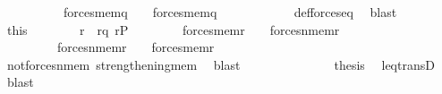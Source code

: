 \begin{isabellebody}
\ \ \ \ \ \ \ \ \ {\isacharparenleft}{\kern0pt}{\isasymnot}\ forces{\isacharunderscore}{\kern0pt}mem{\isacharparenleft}{\kern0pt}q{\isacharcomma}{\kern0pt}\ {\isasymsigma}{\isacharcomma}{\kern0pt}\ {\isasymtau}{\isacharparenright}{\kern0pt}\ {\isasymand}\ forces{\isacharunderscore}{\kern0pt}mem{\isacharparenleft}{\kern0pt}q{\isacharcomma}{\kern0pt}\ {\isasymsigma}{\isacharcomma}{\kern0pt}\ {\isasymtheta}{\isacharparenright}{\kern0pt}{\isacharparenright}{\kern0pt}{\isachardoublequoteclose}\isanewline
\ \ \ \ \ \ \ \ \isamarkupfalse%
\ def{\isacharunderscore}{\kern0pt}forces{\isacharunderscore}{\kern0pt}eq\ \isamarkupfalse%
\ blast\isanewline
\ \ \ \ \ \ \isamarkupfalse%
\ \isamarkupfalse%
\ this\isanewline
\ \ \ \ \ \ \isamarkupfalse%
\ r\ \ {\isachardoublequoteopen}r{\isasympreceq}q{\isachardoublequoteclose}\ {\isachardoublequoteopen}r{\isasymin}P{\isachardoublequoteclose}\isanewline
\ \ \ \ \ \ \ \ {\isachardoublequoteopen}{\isacharparenleft}{\kern0pt}forces{\isacharunderscore}{\kern0pt}mem{\isacharparenleft}{\kern0pt}r{\isacharcomma}{\kern0pt}\ {\isasymsigma}{\isacharcomma}{\kern0pt}\ {\isasymtau}{\isacharparenright}{\kern0pt}\ {\isasymand}\ forces{\isacharunderscore}{\kern0pt}nmem{\isacharparenleft}{\kern0pt}r{\isacharcomma}{\kern0pt}\ {\isasymsigma}{\isacharcomma}{\kern0pt}\ {\isasymtheta}{\isacharparenright}{\kern0pt}{\isacharparenright}{\kern0pt}\ {\isasymor}\isanewline
\ \ \ \ \ \ \ \ \ {\isacharparenleft}{\kern0pt}forces{\isacharunderscore}{\kern0pt}nmem{\isacharparenleft}{\kern0pt}r{\isacharcomma}{\kern0pt}\ {\isasymsigma}{\isacharcomma}{\kern0pt}\ {\isasymtau}{\isacharparenright}{\kern0pt}\ {\isasymand}\ forces{\isacharunderscore}{\kern0pt}mem{\isacharparenleft}{\kern0pt}r{\isacharcomma}{\kern0pt}\ {\isasymsigma}{\isacharcomma}{\kern0pt}\ {\isasymtheta}{\isacharparenright}{\kern0pt}{\isacharparenright}{\kern0pt}{\isachardoublequoteclose}\isanewline
\ \ \ \ \ \ \ \ \isamarkupfalse%
\ not{\isacharunderscore}{\kern0pt}forces{\isacharunderscore}{\kern0pt}nmem\ strengthening{\isacharunderscore}{\kern0pt}mem\ \isamarkupfalse%
\ blast\isanewline
\ \ \ \ \ \ \isamarkupfalse%
\isanewline
\ \ \ \ \ \ \isamarkupfalse%
\ {\isacharquery}{\kern0pt}thesis\ \isamarkupfalse%
\ leq{\isacharunderscore}{\kern0pt}transD\ \isamarkupfalse%
\ blast\isanewline
\ \ \ \ \isamarkupfalse%
\isanewline
\ \ \ \ \isamarkupfalse%
\isanewline

\end{isabellebody}
